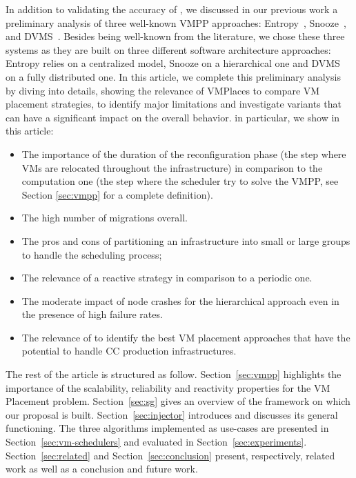 In addition to validating the accuracy of \vmps, we discussed in our
previous work \cite{vmplaces:europar15} a preliminary analysis of
three well-known VMPP approaches:
Entropy~\cite{Hermenier:2009:ECM:1508293.1508300},
Snooze~\cite{feller:ccgrid12}, and DVMS~\cite{quesnel:cpe2012}.
Besides being well-known from the literature, we chose these three
systems as they are built on three different software architecture
approaches: Entropy relies on a centralized model, Snooze on a
hierarchical one and DVMS on a fully distributed one. In this article,
we complete this preliminary analysis by diving into details, showing
the relevance of VMPlaces to compare VM placement strategies, to
identify major limitations and investigate variants that can have a
significant impact on the overall behavior.  in particular, we show in
this article:
\begin{itemize}
  \item The importance of the duration of the reconfiguration phase
    (\ie the step where VMs are relocated throughout the
    infrastructure) in comparison to the computation one (\ie the step
    where the scheduler try to solve the VMPP, see Section
    \ref{sec:vmpp} for a complete definition).
\item The high number of migrations overall.
  \item The pros and cons of partitioning an infrastructure into small
    or large groups to handle the scheduling process;
  \item The relevance of a reactive strategy in comparison to a
    periodic one.
  \item The moderate impact of node crashes for the hierarchical
approach even in the presence of high failure rates.
  \item The relevance of \vmps to identify the best VM placement
    approaches that have the potential to handle CC production
    infrastructures.
\end{itemize}

The rest of the article is structured as
follow. Section~\ref{sec:vmpp} highlights the importance of the
scalability, reliability and reactivity properties for the VM
Placement problem.  Section~\ref{sec:sg} gives an overview of the \sg
framework on which our proposal is built. Section~\ref{sec:injector}
introduces \vmps and discusses its general functioning. The three
algorithms implemented as use-cases are presented in
Section~\ref{sec:vm-schedulers} and evaluated in
Section~\ref{sec:experiments}. Section~\ref{sec:related} and
Section~\ref{sec:conclusion} present, respectively, related work as
well as a conclusion and future work.

